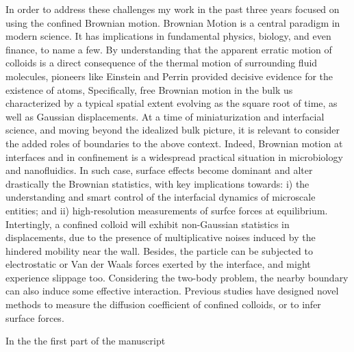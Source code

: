In order to address these challenges my work in the past three years focused on using the confined Brownian motion. Brownian Motion is a central paradigm in modern science. It has implications in fundamental physics, biology, and even finance, to name a few. By understanding that the apparent erratic motion of colloids is a direct consequence of the thermal motion of surrounding fluid molecules, pioneers like Einstein and Perrin provided decisive evidence for the existence of atoms, Specifically, free Brownian motion in the bulk us characterized by a typical spatial extent evolving as the square root of time, as well as Gaussian displacements. At a time of miniaturization and interfacial science, and moving beyond the idealized bulk picture, it is relevant to consider the added roles of boundaries to the above context. Indeed, Brownian motion at interfaces and in confinement is a widespread practical situation in microbiology and nanofluidics. In such case, surface effects become dominant and alter drastically the Brownian statistics, with key implications towards: i) the understanding and smart control of the interfacial dynamics of microscale entities; and ii) high-resolution measurements of surfce forces at equilibrium.
Intertingly, a confined colloid will exhibit non-Gaussian statistics in displacements, due to the presence of multiplicative noises induced by the hindered mobility near the wall. Besides, the particle can be subjected to electrostatic or Van der Waals forces exerted by the interface, and might experience slippage too. Considering the two-body problem, the nearby boundary can also induce some effective interaction. Previous studies have designed novel methods to measure the diffusion coefficient of confined colloids, or to infer surface forces.

In the the first part of the manuscript 